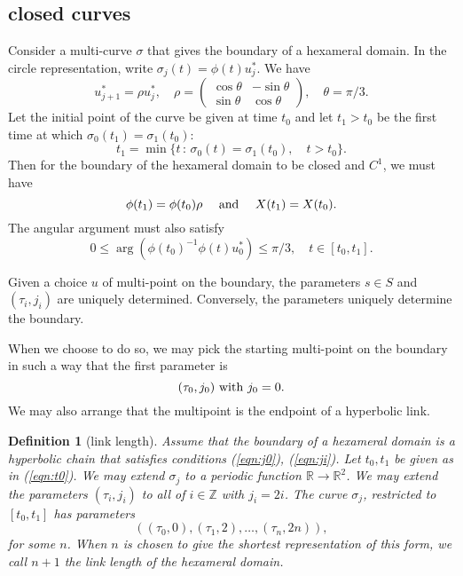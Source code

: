 \documentclass[11pt]{amsart}
\newtheorem{definition}[equation]{Definition}
\newcommand{\ring}[1]{\mathbb{#1}}
\def\rZ{{\ring{Z}}}
\def\rR{{\ring{R}}}
\def\ta{{\tau}}
\def\mid{\,:\,}
\begin{document}
\subsection{closed curves}

Consider a multi-curve $\sigma$ that gives the boundary of a hexameral
domain.  In the circle representation, write $\sigma_j(t) =
\phi(t)u^*_j$.  We have
\[
u^*_{j+1} = \rho u^*_j,\quad \rho=
\left(\begin{array}{ccc} \cos\theta & -\sin\theta\\ 
\sin\theta & \cos\theta\end{array}\right),\quad \theta=\pi/3.
\]
Let the initial point of the curve be given at time $t_0$ and let $t_1>t_0$ be the first time
at which $\sigma_0(t_1) = \sigma_1(t_0)$:
\begin{equation}\label{eqn:t0}
t_1 = \min \{ t \mid \sigma_0(t) = \sigma_1(t_0), \quad t>t_0\}.
\end{equation} 
Then for the boundary of the hexameral domain to be closed
and $C^1$, we must have
\begin{equation}\label{eqn:closed}
\phi(t_1) = \phi(t_0)\rho\quad\hbox{ and }\quad X(t_1) = X(t_0).
\end{equation}
The angular argument must also satisfy
\begin{equation}\label{eqn:arg}
0\le \arg (\phi(t_0)^{-1}\phi(t)u^*_0) \le \pi/3,\quad t\in[t_0,t_1].
\end{equation}

Given a choice $u$ of multi-point on the boundary, the parameters $s\in S$ and $(\ta_i,j_i)$
are uniquely determined.  Conversely, the parameters uniquely determine the boundary.

When we choose to do so, we may pick the starting multi-point on
the boundary in such a way
that the first parameter is
\begin{equation}\label{eqn:j0}
(\ta_0,j_0) \hbox{ with } j_0=0.
\end{equation}  
We may also arrange
that the multipoint is the endpoint of a hyperbolic link.

\begin{definition}[link length]
Assume that the boundary of a hexameral domain is a hyperbolic
chain that satisfies conditions (\ref{eqn:j0}), (\ref{eqn:ji}).
Let $t_0,t_1$ be given as in (\ref{eqn:t0}).  We may extend
$\sigma_j$ to a periodic function $\rR\to\rR^2$.  We may extend
the parameters $(\ta_i,j_i)$ to all of $i\in\rZ$ with $j_i = 2i$.
The curve $\sigma_j$, restricted to $[t_0,t_1]$ has parameters
$$
((\ta_0,0),(\ta_1,2),\ldots,(\ta_n,2n)),
$$
for some $n$.  When $n$ is chosen to give the shortest representation
of this form, we call $n+1$ the {\it link length} of the hexameral
domain.
\end{definition}
\end{document}
